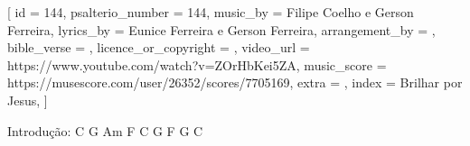 
[
    id                     = {144},
    psalterio_number       = {144},
    music_by               = {Filipe Coelho e Gerson Ferreira},
    lyrics_by              = {Eunice Ferreira e Gerson Ferreira},
    arrangement_by         = {},
    bible_verse            = {},
    licence_or_copyright   = {},
    video_url              = {https://www.youtube.com/watch?v=ZOrHbKei5ZA},
    music_score            = {https://musescore.com/user/26352/scores/7705169},
    extra                  = {},
    index                  = {Brilhar por Jesus},
]


\beginverse
Introdução: C G Am F C G F G C

